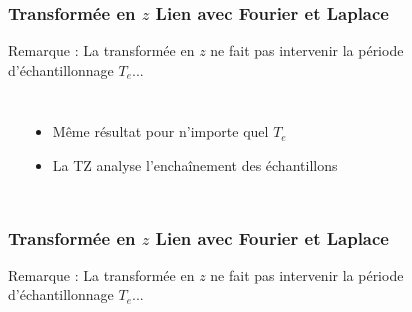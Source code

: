 \documentclass{beamer}
\begin{document}
\begin{frame}
\frametitle{Transformée en $z$ Lien avec Fourier et Laplace}

Remarque : La transformée en $z$ ne fait pas intervenir la période d'échantillonnage $T_e$...\\
\begin{columns}
\column{60mm}
\begin{center}
\end{center}
\column{60mm}
\begin{itemize}
\item Même résultat pour n'importe quel $T_e$
\vspace{0.3cm}
\item La TZ analyse l'enchaînement des échantillons
\end{itemize}

\end{columns}
\end{frame}

\begin{frame}
\frametitle{Transformée en $z$ Lien avec Fourier et Laplace}

Remarque : La transformée en $z$ ne fait pas intervenir la période d'échantillonnage $T_e$...\\

\vspace{1cm}

\vspace{1cm}

\end{frame}
\end{document}
